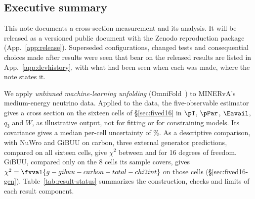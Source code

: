 \subsection*{Executive summary}
\label{sec:execsummary}

This note documents a cross-section measurement and its analysis. It will be released as a versioned public document with the Zenodo reproduction package (App.~\ref{app:release}). Superseded configurations, changed tests and consequential choices made after results were seen that bear on the released results are listed in App.~\ref{app:devhistory}, with what had been seen when each was made, where the note states it.

We apply \emph{unbinned machine-learning unfolding} (OmniFold~\cite{Andreassen:2019cjw, Andreassen:2021zzk}) to MINERvA's medium-energy neutrino data. Applied to the data, the five-observable estimator gives a cross section on the sixteen cells of \S\ref{sec:fived16} in $\pT$, $\pPar$, $\Eavail$, $q_{3}$ and $W$, as illustrative output, not for fitting or for constraining models. Its covariance gives a median per-cell uncertainty of \%. As a descriptive comparison, with NuWro and GiBUU on carbon, three external generator predictions, compared on all sixteen cells, give $\chi^{2}$ between  and  for 16 degrees of freedom. GiBUU, compared only on the 8 cells its sample covers, gives $\chi^{2}=\fvval{g-gibuu-carbon-total-chi2int}$ on those cells (\S\ref{sec:fived16-gen}). Table~\ref{tab:result-status} summarizes the construction, checks and limits of each result component.



